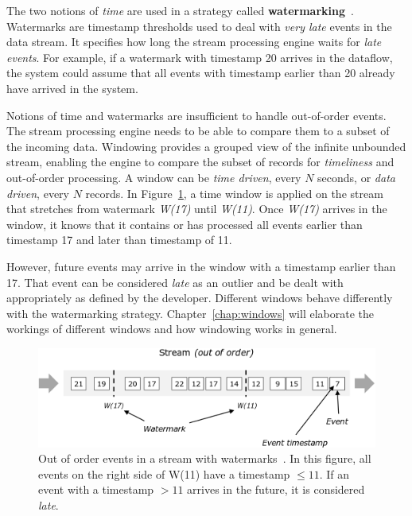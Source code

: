 The two notions of \emph{time} are used in a strategy called \textbf{watermarking}~\cite{watermark_millwheel}. 
Watermarks are timestamp thresholds used to deal with \emph{very late} events 
in the data stream. It specifies how long the stream processing engine 
waits for \emph{late events}. For example, if a watermark with timestamp 
20 arrives in the dataflow, the system could assume that all events 
with timestamp earlier than 20 already have arrived in the system. 

Notions of time and watermarks are insufficient to handle out-of-order 
events. The stream processing engine needs to be able to compare them to a subset of the 
incoming data. Windowing provides a grouped view of the infinite unbounded stream, 
enabling the engine to compare the subset of records for \emph{timeliness} and out-of-order 
processing. A window can be \emph{time driven}, every $N$ seconds, or \emph{data driven}, 
every $N$ records. 
In Figure~\ref{fig:watermark}, a time window is applied on the stream that
stretches from watermark \emph{W(17)} until \emph{W(11)}. 
Once \emph{W(17)} arrives in the window, it knows that it contains or has 
processed all events earlier than timestamp 17 and later than timestamp of 11.  

However, future events may arrive in the window 
with a timestamp earlier than 17. That event can be considered \emph{late} as an outlier and 
be dealt with appropriately as defined by the developer. Different windows 
behave differently with the watermarking strategy. Chapter~\ref{chap:windows}
will elaborate the workings of different windows and how windowing works in 
general. 


\begin{figure}[htpb]
    \centering
    \includegraphics[width=0.8\linewidth]{fig/stream_watermark_out_of_order.png}
    \caption{Out of order events in a stream with watermarks~\cite{watermark_flink}. In this figure, 
    all events on the right side of W(11) have a timestamp $\le 11$. If an event with 
    a timestamp $> 11$ arrives in the future, it is considered \emph{late}.}
    \label{fig:watermark}
\end{figure}


